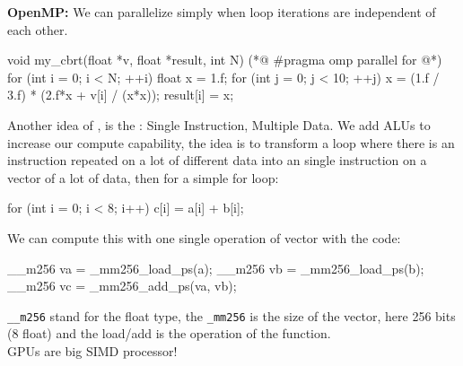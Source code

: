 \textbf{OpenMP:} We can parallelize simply when loop iterations are independent of each other.
    \begin{codeCenter}
    \begin{Ccode}
void my_cbrt(float *v, float *result, int N) {
   (*@ \colorbox{red!30}{\#pragma omp parallel for} @*)
    for (int i = 0; i < N; ++i) {
    float x = 1.f;
    for (int j = 0; j < 10; ++j)
    x = (1.f / 3.f) * (2.f*x + v[i] / (x*x));
    result[i] = x;
    }
}    
    \end{Ccode}
    \end{codeCenter}
    
    \begin{tcolorbox}[vert]
        
    
        \hypertarget{simd}{}
        Another idea of , is the : Single Instruction, Multiple Data. We add ALUs to increase our compute capability, the idea is to transform a loop where there is an instruction repeated on a lot of different data into an single instruction on a vector of a lot of data, then for a simple for loop:
        \begin{codeCenter}
        \begin{Ccode}
for (int i = 0; i < 8; i++)
c[i] = a[i] + b[i];
        \end{Ccode}
        \end{codeCenter}
        We can compute this with one single operation of vector with the code:
        \begin{codeCenter}
        \begin{Ccode}
__m256 va = _mm256_load_ps(a);
__m256 vb = _mm256_load_ps(b);
__m256 vc = _mm256_add_ps(va, vb);
        \end{Ccode}
        \end{codeCenter}
        \lstinline!__m256! stand for the float type, the \lstinline!_mm256! is the size of the vector, here 256 bits (8 float) and the load/add is the operation of the function.\\
        GPUs are big SIMD processor!
    \end{tcolorbox}
